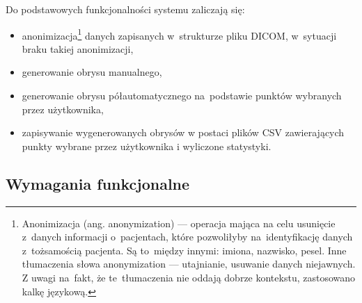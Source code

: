 \documentclass[a4paper,11pt,twoside,openright]{report}
\theoremstyle{definition}
\begin{document}
Do podstawowych funkcjonalności systemu zaliczają się:
\begin{itemize}[noitemsep]
\item anonimizacja\footnote {Anonimizacja (ang. anonymization) --- operacja mająca
na celu usunięcie z~danych informacji o~pacjentach, które pozwoliłyby na~identyfikację
danych z~tożsamością pacjenta. Są to~między innymi: imiona, nazwisko, pesel.
Inne tłumaczenia słowa anonymization --- utajnianie, usuwanie danych niejawnych.
Z uwagi na~fakt, że te~tłumaczenia nie oddają dobrze kontekstu, zastosowano kalkę
językową.} danych zapisanych w~strukturze pliku DICOM, w~sytuacji braku takiej anonimizacji,
\item generowanie obrysu manualnego,
\item generowanie obrysu półautomatycznego na~podstawie punktów wybranych przez użytkownika,
\item zapisywanie wygenerowanych obrysów w postaci plików CSV zawierających
punkty wybrane przez użytkownika i wyliczone statystyki.
\end{itemize}

\subsection {Wymagania funkcjonalne}
\end{document}
